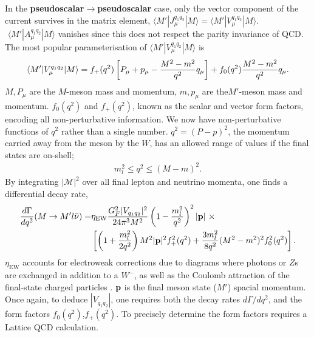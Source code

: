 In the {\bf{pseudoscalar$\to$pseudoscalar}} case, only the vector component of the current survives in the matrix element, $\langle M' | J_{\mu}^{q_1q_2} | M \rangle = \langle M' | V_{\mu}^{q_1q_2} | M \rangle$. $\,\,\langle M' | A_{\mu}^{q_1q_2} | M \rangle$ vanishes since this does not respect the parity invariance of QCD. The most popular parameterisation of $\langle M' | V_{\mu}^{q_1q_2} | M \rangle$ is
\begin{align}
  \langle M' | V_{\mu}^{q_1q_2} | M \rangle = f_+(q^2) \left[ P_{\mu} + p_{\mu} - {M^2-m^2\over q^2} q_{\mu} \right]  + f_0(q^2) {M^2-m^2\over q^2} q_{\mu}.
  \label{eq:formfactors_experimental}
\end{align}
$M,P_{\mu}$ are the $M$-meson mass and momentum, $m,p_{\mu}$ are the$M'$-meson mass and momentum. $f_0(q^2)$ and $f_+(q^2)$, known as the scalar and vector form factors, encoding all non-perturbative information. We now have non-perturbative functions of $q^2$ rather than a single number. $q^2=(P-p)^2$, the momentum carried away from the meson by the $W$, has an allowed range of values if the final states are on-shell;
\begin{align}
  m_l^2 \leq q^2 \leq (M-m)^2.
\end{align}
By integrating $|\mathcal{M}|^2$ over all final lepton and neutrino momenta, one finds a differential decay rate,
\begin{align}
  {d\Gamma\over dq^2}(M\to M'l\bar{\nu}) =& \eta_{\text{EW}} { G_F^2 |V_{q_1q_2}|^2\over 24 \pi^3 M^2 } \left( 1 - {m_l^2\over q^2}\right)^2 |{\bf{p}}| \,\,\times \\
  \label{eq:branchingfraction}
  &\left[ \left( 1 + {m_l^2\over 2q^2}\right) M^2 |{\bf{p}}|^2 f_+^2(q^2) + {3m_l^2\over 8q^2} (M^2-m^2)^2 f_0^2(q^2) \right]. \nonumber
\end{align}
${\eta}_{\text{EW}}$ accounts for electroweak corrections due to diagrams where photons or $Z$s are exchanged in addition to a $W^-$, as well as the Coulomb attraction of the final-state charged particles \cite{SIRLIN198283,Ginsberg1968,PhysRevD.41.1736}. ${\bf{p}}$ is the final meson state ($M'$) spacial momentum. Once again, to deduce $|V_{q_1q_2}|$, one requires both the decay rates $d\Gamma/dq^2$, and the form factors $f_0(q^2)$,$f_+(q^2)$. To precisely determine the form factors requires a Lattice QCD calculation.

